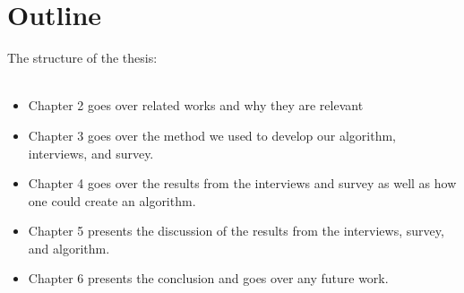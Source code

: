 \section{Outline}
The structure of the thesis:\\\\
\begin{itemize}
    \item Chapter 2 goes over related works and why they are relevant
    \item Chapter 3 goes over the method we used to develop our algorithm, interviews, and survey.
    \item Chapter 4 goes over the results from the interviews and survey as well as how one could create an algorithm.
    \item Chapter 5 presents the discussion of the results from the interviews, survey, and algorithm.
    \item Chapter 6 presents the conclusion and goes over any future work.
\end{itemize}
